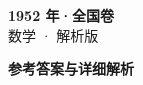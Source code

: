 \documentclass[zihao=-4, a4paper]{ctexart}
\begin{document}
\begin{center}
  {\Large\bfseries 1952 年·全国卷}\\[4pt]
  {\large 数学 · 解析版}
\end{center}
\medskip
{}

\clearpage
{}
\begin{center}{\Large\bfseries 参考答案与详细解析}\end{center}
\medskip

\end{document}
